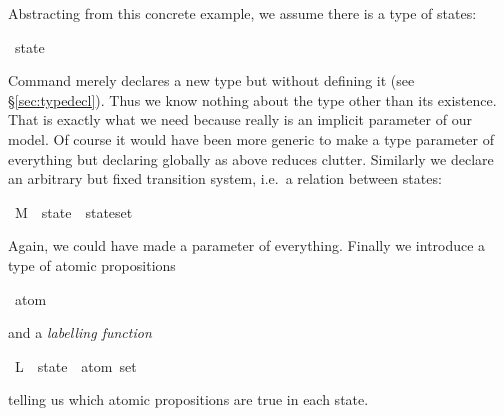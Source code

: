 \begin{isabellebody}
\begin{isamarkuptext}
Abstracting from this concrete example, we assume there is a type of
states:%
\end{isamarkuptext}%
\isamarkuptrue%
\isamarkupfalse%
\ state%
\begin{isamarkuptext}%
\noindent
Command  merely declares a new type but without
defining it (see \S\ref{sec:typedecl}). Thus we know nothing
about the type other than its existence. That is exactly what we need
because  really is an implicit parameter of our model.  Of
course it would have been more generic to make  a type
parameter of everything but declaring  globally as above
reduces clutter.  Similarly we declare an arbitrary but fixed
transition system, i.e.\ a relation between states:%
\end{isamarkuptext}%
\isamarkuptrue%
\isamarkupfalse%
\ M\ {\isacharcolon}{\isacharcolon}\ {\isachardoublequoteopen}{\isacharparenleft}state\ {\isasymtimes}\ state{\isacharparenright}set{\isachardoublequoteclose}%
\begin{isamarkuptext}%
\noindent
Again, we could have made  a parameter of everything.
Finally we introduce a type of atomic propositions%
\end{isamarkuptext}%
\isamarkuptrue%
\isamarkupfalse%
\ atom%
\begin{isamarkuptext}%
\noindent
and a \emph{labelling function}%
\end{isamarkuptext}%
\isamarkuptrue%
\isamarkupfalse%
\ L\ {\isacharcolon}{\isacharcolon}\ {\isachardoublequoteopen}state\ {\isasymRightarrow}\ atom\ set{\isachardoublequoteclose}%
\begin{isamarkuptext}%
\noindent
telling us which atomic propositions are true in each state.%
\end{isamarkuptext}%
\isamarkuptrue%
%
\isadelimtheory
%
\endisadelimtheory
%
\isatagtheory
%
\endisatagtheory
{\isafoldtheory}%
%
\isadelimtheory
%
\endisadelimtheory
\end{isabellebody}%
